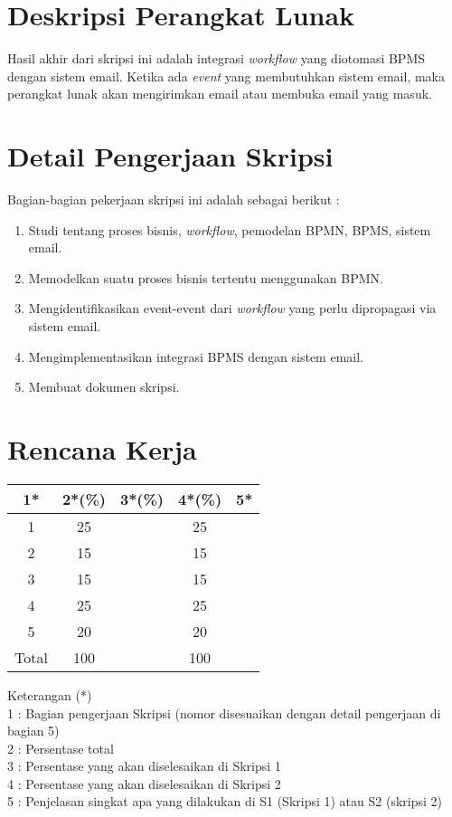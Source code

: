 \documentclass[a4paper,twoside]{article}
\begin{document}
\section{Deskripsi Perangkat Lunak}
Hasil akhir dari skripsi ini adalah integrasi \textit{workflow} yang diotomasi BPMS dengan sistem email. Ketika ada \textit{event} yang membutuhkan sistem email, maka perangkat lunak akan mengirimkan email atau membuka email yang masuk.

		

\section{Detail Pengerjaan Skripsi}
Bagian-bagian pekerjaan skripsi ini adalah sebagai berikut :
	\begin{enumerate}
		\item Studi tentang proses bisnis, \textit{workflow}, pemodelan BPMN, BPMS, sistem email.
		\item Memodelkan suatu proses bisnis tertentu menggunakan BPMN.
		\item Mengidentifikasikan event-event dari \textit{workflow} yang perlu dipropagasi via sistem email.
		\item Mengimplementasikan integrasi BPMS dengan sistem email.
		\item Membuat dokumen skripsi.
	\end{enumerate}

\section{Rencana Kerja}


\begin{center}
  \begin{tabular}{ | c | c | c | c | l |}
    \hline
    1*  & 2*(\%) & 3*(\%) & 4*(\%) &5*\\ \hline \hline
    1   & 25  &   & 25 &  \\ \hline
    2   & 15  &   & 15 &  \\ \hline
    3   & 15  &   & 15 &  \\ \hline
    4   & 25  &   & 25 &  \\ \hline
    5   & 20  &   & 20 &  \\ \hline
    Total  & 100  &   & 100 &  \\ \hline
                          \end{tabular}
\end{center}

Keterangan (*)\\
1 : Bagian pengerjaan Skripsi (nomor disesuaikan dengan detail pengerjaan di bagian 5)\\
2 : Persentase total \\
3 : Persentase yang akan diselesaikan di Skripsi 1 \\
4 : Persentase yang akan diselesaikan di Skripsi 2 \\
5 : Penjelasan singkat apa yang dilakukan di S1 (Skripsi 1) atau S2 (skripsi 2)
\end{document}
